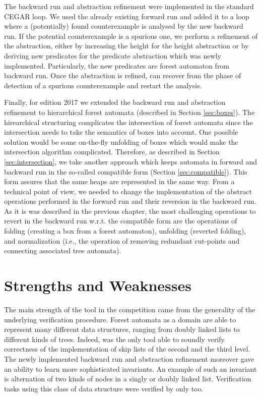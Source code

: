 {The backward run and abstraction refinement were implemented in the standard CEGAR loop.
We used the already existing forward run and added it to a loop where a (potentially) found counterexample
is analysed by the new backward run. If the potential counterexample is a spurious one, we perform a refinement of the abstraction, either
by increasing the height for the height abstraction or by deriving new predicates for the predicate abstraction
which was newly implemented.
Particularly, the new predicates are forest automaton from backward run.
Once the abstraction is refined, \forester can recover from the phase of detection of a spurious counterexample and restart the analysis.

Finally, for edition 2017 we extended the backward run and abstraction refinement to hierarchical forest automata
(described in Section \ref{sec:boxes}).
The hirearchical structuring complicates the intersection of forest automata since the intersection needs to take the semantics of boxes into account.
One possible solution would be some on-the-fly unfolding of boxes which would make the intersection algorithm complicated.
Therefore, as described in Section \ref{sec:intersection}, we take another approach which keeps automata in forward and backward run in the so-called compatible form (Section \ref{sec:compatible}).
This form assures that the same heaps are represented in the same way.
From a technical point of view, we needed to change the implementation of the abstract operations performed in the forward run and
their reversion in the backward run.
As it is was described in the previous chapter, the most challenging operations to revert in the backward run
w.r.t. the compatible form are the operations of folding (creating a box from a forest automaton), unfolding (reverted folding),
and normalization (i.e., the operation of removing redundant cut-points and connecting associated tree automata).

\section{Strengths and Weaknesses}

The main strength of the \forester tool in the competition came from the generality of the underlying
verification procedure.
Forest automata as a domain are able to represent many different data structures,
ranging from doubly linked lists to different kinds of trees.
Indeed, \forester was the only tool able to soundly verify correctness of the implementation of skip lists
of the second and the third level.
The newly implemented backward run and abstraction refinement moreover gave \forester
an ability to learn more sophisticated invariants.
An example of such an invariant is alternation of two kinds of nodes in a singly or doubly linked list.
Verification tasks using this class of data structure were verified by \forester only too.

}
